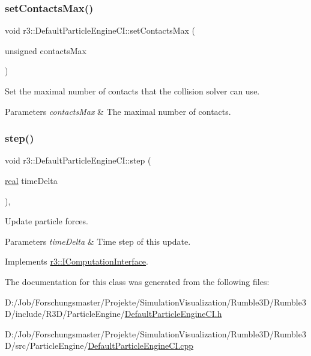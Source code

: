 \subsubsection{\texorpdfstring{set\+Contacts\+Max()}{setContactsMax()}}
{\footnotesize\ttfamily void r3\+::\+Default\+Particle\+Engine\+C\+I\+::set\+Contacts\+Max (\begin{DoxyParamCaption}\item[{unsigned}]{contacts\+Max }\end{DoxyParamCaption})}



Set the maximal number of contacts that the collision solver can use. 


\begin{DoxyParams}{Parameters}
{\em contacts\+Max} & The maximal number of contacts. \\
\hline
\end{DoxyParams}
\mbox{\label{classr3_1_1_default_particle_engine_c_i_a7c58fd00ec521410e1b412e9885ee0d2}} 
\subsubsection{\texorpdfstring{step()}{step()}}
{\footnotesize\ttfamily void r3\+::\+Default\+Particle\+Engine\+C\+I\+::step (\begin{DoxyParamCaption}\item[{\mbox{\hyperlink{namespacer3_ab2016b3e3f743fb735afce242f0dc1eb}{real}}}]{time\+Delta }\end{DoxyParamCaption})\hspace{0.3cm}{\ttfamily [override]}, {\ttfamily [virtual]}}



Update particle forces. 


\begin{DoxyParams}{Parameters}
{\em time\+Delta} & Time step of this update. \\
\hline
\end{DoxyParams}


Implements \mbox{\hyperlink{classr3_1_1_i_computation_interface_aaa12bcc35005f32a1984b38de97696cb}{r3\+::\+I\+Computation\+Interface}}.



The documentation for this class was generated from the following files\+:\begin{DoxyCompactItemize}
\item 
D\+:/\+Job/\+Forschungsmaster/\+Projekte/\+Simulation\+Visualization/\+Rumble3\+D/\+Rumble3\+D/include/\+R3\+D/\+Particle\+Engine/\mbox{\hyperlink{_default_particle_engine_c_i_8h}{Default\+Particle\+Engine\+C\+I.\+h}}\item 
D\+:/\+Job/\+Forschungsmaster/\+Projekte/\+Simulation\+Visualization/\+Rumble3\+D/\+Rumble3\+D/src/\+Particle\+Engine/\mbox{\hyperlink{_default_particle_engine_c_i_8cpp}{Default\+Particle\+Engine\+C\+I.\+cpp}}\end{DoxyCompactItemize}
